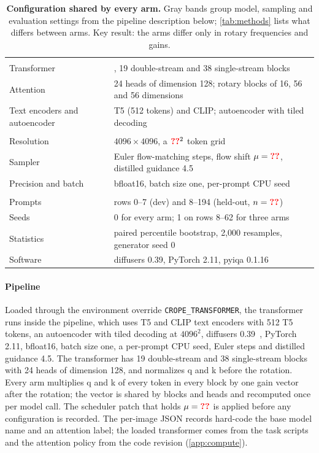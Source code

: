 \begin{table}[!htbp]
\centering
\caption{\textbf{Configuration shared by every arm.} Gray bands group model, sampling and evaluation settings from the pipeline description below; \cref{tab:methods} lists what differs between arms. Key result: the arms differ only in rotary frequencies and gains.}
\label{tab:config}
\footnotesize
\setlength{\tabcolsep}{4pt}
\begin{tabular}{@{}l l@{}}
\toprule
\rowcolor{black!7}\multicolumn{2}{@{}l}{\textit{Model}} \\
Transformer & \krea{}, 19 double-stream and 38 single-stream blocks \\
Attention & 24 heads of dimension 128; rotary blocks of 16, 56 and 56 dimensions \\
Text encoders and autoencoder & T5 (512 tokens) and CLIP; \fluxdev{} autoencoder with tiled decoding \\
\rowcolor{black!7}\multicolumn{2}{@{}l}{\textit{Sampling}} \\
Resolution & $4096\times4096$, a $\N{c@tokside}^2$ token grid \\
Sampler & \N{c@steps} Euler flow-matching steps, flow shift $\mu=\N{c@muofficial}$, distilled guidance 4.5 \\
Precision and batch & bfloat16, batch size one, per-prompt CPU seed \\
\rowcolor{black!7}\multicolumn{2}{@{}l}{\textit{Evaluation}} \\
Prompts & \afk{} rows 0--7 (dev) and 8--194 (held-out, $n=\N{ho@nprompts}$) \\
Seeds & 0 for every arm; 1 on rows 8--62 for three arms \\
Statistics & paired percentile bootstrap, 2,000 resamples, generator seed 0 \\
Software & diffusers 0.39, PyTorch 2.11, pyiqa 0.1.16 \\
\bottomrule
\end{tabular}
\end{table}

\paragraph{Pipeline}
Loaded through the environment override \mbox{\texttt{CROPE\_TRANSFORMER}}, the \krea{} transformer runs inside the \fluxdev{} pipeline, which uses T5 and CLIP text encoders with 512 T5 tokens, an autoencoder with tiled decoding at $4096^2$, diffusers 0.39~\citep{vonplaten2022diffusers}, PyTorch 2.11, bfloat16, batch size one, a per-prompt CPU seed,  Euler steps and distilled guidance 4.5. The transformer has 19 double-stream and 38 single-stream blocks with 24 heads of dimension 128, and normalizes q and k before the rotation. Every arm multiplies q and k of every token in every block by one gain vector after the rotation; the vector is shared by blocks and heads and recomputed once per model call. The scheduler patch that holds $\mu=\N{c@muofficial}$ is applied before any configuration is recorded. The per-image JSON records hard-code the base model name and an attention label; the loaded transformer comes from the task scripts and the attention policy from the code revision (\cref{app:compute}).

